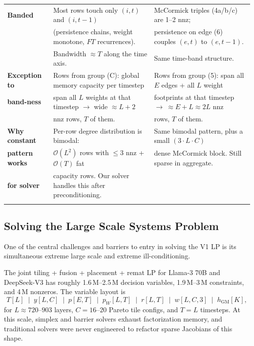 \begin{table}[ht!]
{\begin{tabular}{lll}
\midrule
\textbf{Banded} &
Most rows touch only $(i,t)$ and $(i,t{-}1)$ &
McCormick triples (4a/b/c) are 1–2 nnz; \\
& (persistence chains, weight monotone, $\mathit{FT}$ recurrences). &
persistence on edge (6) couples $(e,t)$ to $(e,t{-}1)$. \\
& Bandwidth $\approx T$ along the time axis. & Same time-band structure. \\
\midrule
\textbf{Exception to} &
Rows from group (C): global memory capacity per timestep &
Rows from group (5): span all $E$ edges + all $L$ weight \\
\textbf{band-ness} &
span all $L$ weights at that timestep $\to$ wide ${\approx}L{+}2$ &
footprints at that timestep $\to\ {\approx}E{+}L \approx 2L$ nnz \\
& nnz rows, $T$ of them. & rows, $T$ of them. \\
\midrule
\textbf{Why constant} &
Per-row degree distribution is bimodal: &
Same bimodal pattern, plus a small $(3 \cdot L \cdot C)$ \\
\textbf{pattern works} &
$\mathcal{O}(L^2)$ rows with ${\leq}3$ nnz + $\mathcal{O}(T)$ fat &
dense McCormick block. Still sparse in aggregate. \\
\textbf{for solver} &
capacity rows. Our solver handles this after preconditioning. & \\
\bottomrule
\label{tab:LP_struct}
\end{tabular}%
}
\end{table}

\subsection{Solving the Large Scale Systems Problem}
\label{app:solver}

One of the central challenges and barriers to entry in solving the V1 LP
is its simultaneous extreme large scale and extreme ill-conditioning.

The joint tiling + fusion + placement + remat LP for Llama-3 70B and
DeepSeek-V3 has roughly 1.6\,M--2.5\,M decision variables, 1.9\,M--3\,M
constraints, and 4\,M nonzeros. The variable layout is
\[
    T[L] \;\mid\; y[L,C] \;\mid\; p[E,T] \;\mid\; p_W[L,T]
    \;\mid\; r[L,T] \;\mid\; w[L,C,3] \;\mid\; h_{\mathrm{GM}}[K],
\]
for $L \approx 720$--$903$ layers, $C = 16$--$20$ Pareto tile configs,
and $T = L$ timesteps. At this scale, simplex and barrier solvers exhaust
factorization memory, and traditional solvers were never engineered to
refactor sparse Jacobians of this shape.

